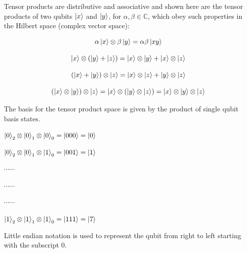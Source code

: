 \documentclass{article}
\begin{document}
\noindent
Tensor products are distributive and associative and shown here are the tensor products of two qubits $\ket{x}$ and $\ket{y}$, for $\alpha , \beta \in \mathbb{C}$, which obey such properties in the Hilbert space (complex vector space)\cite{noauthor_lecture_nodate}:
\vspace{5mm}


\begin{equation}
\alpha\ket{x} \otimes \beta\ket{y} = \alpha\beta\ket{xy}
\end{equation}
\vspace{5mm}


\begin{equation}\ket{x} \otimes (\ket{y} + \ket{z}) = \ket{x}\otimes \ket{y} + \ket{x}\otimes\ket{z}
\end{equation}
\vspace{5mm}


\begin{equation}
(\ket{x} + \ket{y}) \otimes \ket{z} = \ket{x}\otimes \ket{z} + \ket{y}\otimes\ket{z}
\end{equation}
\vspace{5mm}


\begin{equation}
(\ket{x} \otimes \ket{y}) \otimes \ket{z} = \ket{x} \otimes (\ket{y} \otimes\ket{z}) = \ket{x} \otimes \ket{y} \otimes\ket{z}
\end{equation}
\vspace{10mm}

The basis for the tensor product space is given by the product of single qubit basis states.
\vspace{5mm}

\begin{center}
$\ket{0}_2 \otimes \ket{0}_1 \otimes \ket{0}_0 = \ket{000} = \ket{0}$
\vspace{5mm}

$\ket{0}_2 \otimes \ket{0}_1 \otimes \ket{1}_0 = \ket{001} = \ket{1}$
\vspace{5mm}

$\cdots \cdots $

$\cdots \cdots$

$\cdots \cdots$
\vspace{5mm}

$\ket{1}_2 \otimes \ket{1}_1 \otimes \ket{1}_0 = \ket{111} = \ket{7}$
\end{center}
\vspace{5mm}

Little endian notation is used to represent the qubit from right to left starting with the subscript 0.
\end{document}
